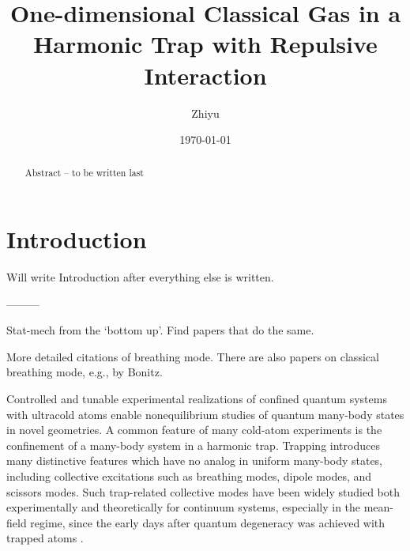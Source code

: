 \documentclass[aps,preprintnumbers,onecolumn,amsmath,amssymb,floatfix,pra]{revtex4-1}
\begin{document}
 \title{One-dimensional Classical Gas in a Harmonic Trap with Repulsive Interaction}
 \author{Zhiyu}

\date{\today}
 
 
\begin{abstract}

Abstract --  to be written last
   
\end{abstract}

\maketitle


\section{Introduction}

Will write Introduction after everything else is written.  

---------


Stat-mech from the `bottom up'.  Find papers that do the same. 

More detailed citations of breathing mode.  There are also papers on classical breathing mode, e.g.,
by Bonitz.  

Controlled and tunable experimental realizations of confined quantum systems with ultracold atoms
enable nonequilibrium studies of quantum many-body states in novel geometries. A common feature of
many cold-atom experiments is the confinement of a many-body system in a harmonic trap. Trapping
introduces many distinctive features which have no analog in uniform many-body states, including
collective excitations such as breathing modes, dipole modes, and scissors modes. Such trap-related
collective modes have been widely studied both experimentally and theoretically for continuum
systems, especially in the mean-field regime, since the early days after quantum degeneracy was
achieved with trapped atoms \cite{Dalfovo1997}\cite{Jin1996}.
\end{document}
